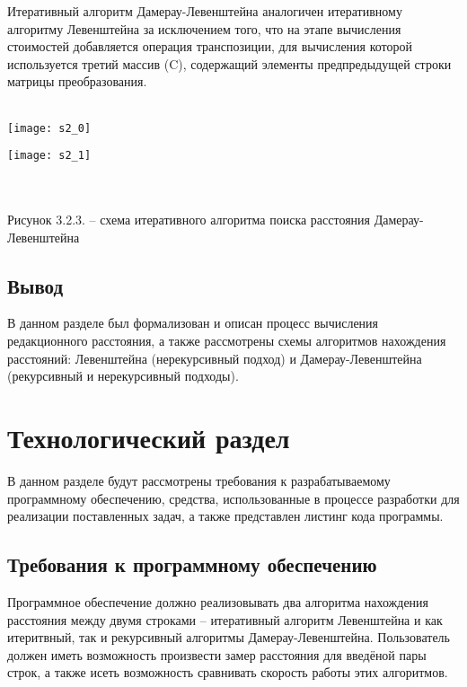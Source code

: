 \documentclass[a4paper, 14pt]{article}
\begin{document}
	\newpage
	
	Итеративный алгоритм Дамерау-Левенштейна аналогичен итеративному алгоритму Левенштейна за исключением того, что на этапе вычисления стоимостей добавляется операция транспозиции, для вычисления которой используется третий массив (C), содержащий элементы предпредыдущей строки матрицы преобразования. \\\\
	
	\begin{minipage}{7cm}
		\texttt{[image: s2\_0]}
	\end{minipage}
	\begin{minipage}{2in}
		\texttt{[image: s2\_1]}
	\end{minipage}\\\\
	
	\small Рисунок 3.2.3. – схема итеративного алгоритма поиска расстояния Дамерау-Левенштейна \normalsize
	
	
	\subsection{Вывод}
	
	В данном разделе был формализован и описан процесс вычисления редакционного расстояния, а также рассмотрены схемы алгоритмов нахождения расстояний: Левенштейна (нерекурсивный подход) и Дамерау-Левенштейна (рекурсивный и нерекурсивный подходы).
	
	\newpage
	
	\section{Технологический раздел}
	
	В данном разделе будут рассмотрены требования к разрабатываемому программному обеспечению, средства, использованные в процессе разработки для реализации поставленных задач, а также представлен листинг кода программы.
	
	\subsection{Требования к программному обеспечению}
	
	Программное обеспечение должно реализовывать два алгоритма нахождения расстояния между двумя строками – итеративный алгоритм Левенштейна и как итеритвный, так и рекурсивный алгоритмы Дамерау-Левенштейна. Пользователь должен иметь возможность произвести замер расстояния для введёной пары строк, а также исеть возможность сравнивать скорость работы этих алгоритмов.
	
\end{document}
